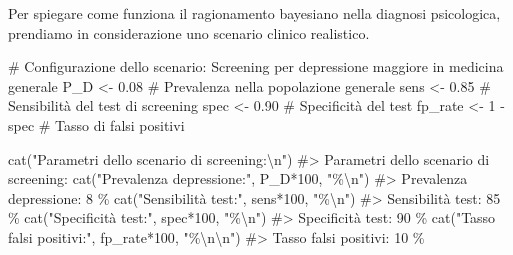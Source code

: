 \documentclass[
  letterpaper,
  DIV=11,
  numbers=noendperiod,
  oneside]{scrreprt}
\newenvironment{Shaded}{\begin{snugshade}}{\end{snugshade}}
\newcommand{\CommentTok}[1]{\textcolor[rgb]{0.37,0.37,0.37}{#1}}
\newcommand{\DecValTok}[1]{\textcolor[rgb]{0.68,0.00,0.00}{#1}}
\newcommand{\FloatTok}[1]{\textcolor[rgb]{0.68,0.00,0.00}{#1}}
\newcommand{\FunctionTok}[1]{\textcolor[rgb]{0.28,0.35,0.67}{#1}}
\newcommand{\NormalTok}[1]{\textcolor[rgb]{0.00,0.23,0.31}{#1}}
\newcommand{\OtherTok}[1]{\textcolor[rgb]{0.00,0.23,0.31}{#1}}
\newcommand{\SpecialCharTok}[1]{\textcolor[rgb]{0.37,0.37,0.37}{#1}}
\newcommand{\StringTok}[1]{\textcolor[rgb]{0.13,0.47,0.30}{#1}}
\theoremstyle{definition}
\theoremstyle{plain}
\theoremstyle{definition}
\theoremstyle{remark}
\begin{document}
\begin{tcolorbox}[enhanced jigsaw, arc=.35mm, breakable, colbacktitle=quarto-callout-note-color!10!white, opacityback=0, toprule=.15mm, rightrule=.15mm, colback=white, opacitybacktitle=0.6, leftrule=.75mm, coltitle=black, bottomtitle=1mm, left=2mm, toptitle=1mm, title=\textcolor{quarto-callout-note-color}{\faInfo}\hspace{0.5em}{Test diagnostico per il disturbo depressivo}, titlerule=0mm, bottomrule=.15mm, colframe=quarto-callout-note-color-frame]

Per spiegare come funziona il ragionamento bayesiano nella diagnosi
psicologica, prendiamo in considerazione uno scenario clinico
realistico.

\begin{Shaded}
\begin{Highlighting}[]
\CommentTok{\# Configurazione dello scenario: Screening per depressione maggiore in medicina generale}
\NormalTok{P\_D }\OtherTok{\textless{}{-}} \FloatTok{0.08}          \CommentTok{\# Prevalenza nella popolazione generale}
\NormalTok{sens }\OtherTok{\textless{}{-}} \FloatTok{0.85}         \CommentTok{\# Sensibilità del test di screening}
\NormalTok{spec }\OtherTok{\textless{}{-}} \FloatTok{0.90}         \CommentTok{\# Specificità del test}
\NormalTok{fp\_rate }\OtherTok{\textless{}{-}} \DecValTok{1} \SpecialCharTok{{-}}\NormalTok{ spec  }\CommentTok{\# Tasso di falsi positivi}

\FunctionTok{cat}\NormalTok{(}\StringTok{"Parametri dello scenario di screening:}\SpecialCharTok{\textbackslash{}n}\StringTok{"}\NormalTok{)}
\CommentTok{\#\textgreater{} Parametri dello scenario di screening:}
\FunctionTok{cat}\NormalTok{(}\StringTok{"Prevalenza depressione:"}\NormalTok{, P\_D}\SpecialCharTok{*}\DecValTok{100}\NormalTok{, }\StringTok{"\%}\SpecialCharTok{\textbackslash{}n}\StringTok{"}\NormalTok{)}
\CommentTok{\#\textgreater{} Prevalenza depressione: 8 \%}
\FunctionTok{cat}\NormalTok{(}\StringTok{"Sensibilità test:"}\NormalTok{, sens}\SpecialCharTok{*}\DecValTok{100}\NormalTok{, }\StringTok{"\%}\SpecialCharTok{\textbackslash{}n}\StringTok{"}\NormalTok{) }
\CommentTok{\#\textgreater{} Sensibilità test: 85 \%}
\FunctionTok{cat}\NormalTok{(}\StringTok{"Specificità test:"}\NormalTok{, spec}\SpecialCharTok{*}\DecValTok{100}\NormalTok{, }\StringTok{"\%}\SpecialCharTok{\textbackslash{}n}\StringTok{"}\NormalTok{)}
\CommentTok{\#\textgreater{} Specificità test: 90 \%}
\FunctionTok{cat}\NormalTok{(}\StringTok{"Tasso falsi positivi:"}\NormalTok{, fp\_rate}\SpecialCharTok{*}\DecValTok{100}\NormalTok{, }\StringTok{"\%}\SpecialCharTok{\textbackslash{}n\textbackslash{}n}\StringTok{"}\NormalTok{)}
\CommentTok{\#\textgreater{} Tasso falsi positivi: 10 \%}
\end{Highlighting}
\end{Shaded}


\end{tcolorbox}
\end{document}
